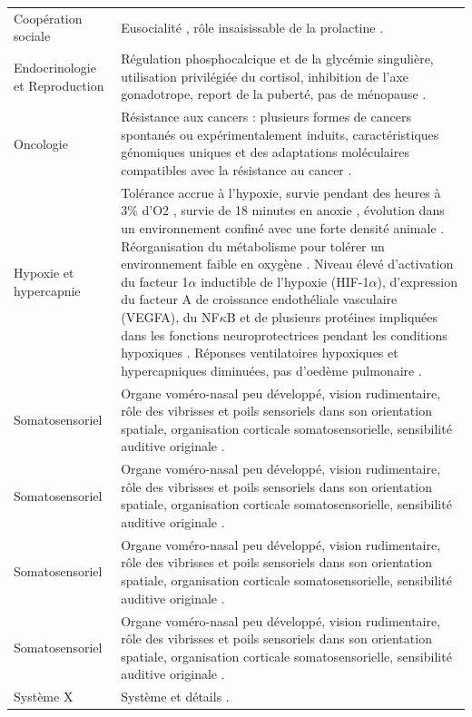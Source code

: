\begin{center}
\begin{longtable}{p{3cm}p{10.5cm}}
Coopération sociale             &   Eusocialité \cite{Ruppell1842, Faulkes2013}, rôle insaisissable de la prolactine \cite{Faulkes2013}. \\
Endocrinologie et \newline Reproduction   &   Régulation phosphocalcique et de la glycémie singulière, utilisation privilégiée du cortisol, inhibition de l’axe gonadotrope, report de la puberté, pas de ménopause \cite{Faulkes2013}.   \\
Oncologie                       & Résistance aux cancers : plusieurs formes de cancers spontanés ou expérimentalement induits, caractéristiques génomiques uniques et des adaptations moléculaires compatibles avec la résistance au cancer \cite{Faulkes2013}.      \\
Hypoxie et \newline hypercapnie          &   Tolérance accrue à l'hypoxie, survie pendant des heures à 3\% d'O2 \cite{Faulkes2013}, survie de 18 minutes en anoxie \cite{Faulkes2013}, évolution dans un environnement confiné avec une forte densité animale \cite{Faulkes2013}. Réorganisation du métabolisme pour tolérer un environnement faible en oxygène \cite{Faulkes2013}. Niveau élevé d'activation du facteur 1$\alpha$ inductible de l'hypoxie (HIF-1$\alpha$), d'expression du facteur A de croissance endothéliale vasculaire (VEGFA), du NF$\kappa$B et de plusieurs protéines impliquées dans les fonctions neuroprotectrices pendant les conditions hypoxiques \cite{Faulkes2013}. Réponses ventilatoires hypoxiques et hypercapniques diminuées, pas d'oedème pulmonaire \cite{Faulkes2013}. \\
Somatosensoriel                 & Organe voméro-nasal peu développé, vision rudimentaire, rôle des vibrisses et poils sensoriels dans son orientation spatiale, organisation corticale somatosensorielle, sensibilité auditive originale \cite{Faulkes2013}.     \\ 
Somatosensoriel                 & Organe voméro-nasal peu développé, vision rudimentaire, rôle des vibrisses et poils sensoriels dans son orientation spatiale, organisation corticale somatosensorielle, sensibilité auditive originale \cite{Faulkes2013}.     \\ 
Somatosensoriel                 & Organe voméro-nasal peu développé, vision rudimentaire, rôle des vibrisses et poils sensoriels dans son orientation spatiale, organisation corticale somatosensorielle, sensibilité auditive originale \cite{Faulkes2013}.     \\ 
Somatosensoriel                 & Organe voméro-nasal peu développé, vision rudimentaire, rôle des vibrisses et poils sensoriels dans son orientation spatiale, organisation corticale somatosensorielle, sensibilité auditive originale \cite{Faulkes2013}.     \\ 
Système X & Système et détails \cite{Faulkes2013}.   \\
\end{longtable}
\end{center}





